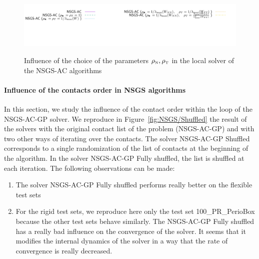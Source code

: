 \begin{figure}
{\includegraphics[height=\legendheight]{../figure/NSGS/rho/1.0e-08/50/time/profile-Chain_legend.pdf}}
  \caption{Influence of the choice of the parameters $\rho_{\hbox{\tiny{N}}}, \rho_{\hbox{\tiny{T}}}$ in the local solver of the {\sf NSGS-AC} algorithms }
  \label{fig:NSGS/rho}
\end{figure}



\paragraph{Influence of the contacts order  in NSGS algorithms}
In this section, we study the influence of the contact order within the loop of the {\sf NSGS-AC-GP} solver. We reproduce in Figure~\ref{fig:NSGS/Shuffled} the result of the solvers with the original contact list of the problem ({\sf NSGS-AC-GP}) and with two other ways of iterating over the contacts. The solver {\sf NSGS-AC-GP Shuffled} corresponds to a single randomization of the list of contacts at the beginning of the algorithm. In the solver  {\sf NSGS-AC-GP Fully shuffled}, the  list is shuffled at each iteration. The following observations can be made:
\begin{enumerate}
\item The solver  {\sf NSGS-AC-GP Fully shuffled} performs really better on the flexible test sets
\item For the rigid test sets, we reproduce here only the test set  100\_PR\_PerioBox because the other test sets behave similarly. The  {\sf NSGS-AC-GP Fully shuffled} has a really bad influence on the convergence of the solver. It seems that it modifies the internal dynamics of the solver in a way that the rate of convergence is really decreased.
\end{enumerate}
